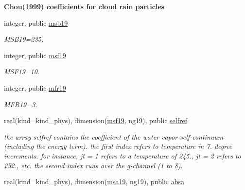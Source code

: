 \begin{Indent}\textbf{ Chou(1999) coefficients for cloud rain particles}\par
\begin{DoxyCompactItemize}
\item 
integer, public \hyperlink{group__module__radsw__kgbnn_ga42771fcf9dd17b5c9d0d03cb2bf1c923}{msb19}
\begin{DoxyCompactList}\small\item\em M\+S\+B19=235. \end{DoxyCompactList}\item 
integer, public \hyperlink{group__module__radsw__kgbnn_ga86778b12ff439f4f83fda891e7ae2bfe}{msf19}
\begin{DoxyCompactList}\small\item\em M\+S\+F19=10. \end{DoxyCompactList}\item 
integer, public \hyperlink{group__module__radsw__kgbnn_ga57f837ef4316dc2441bca3fde3998156}{mfr19}
\begin{DoxyCompactList}\small\item\em M\+F\+R19=3. \end{DoxyCompactList}\item 
real(kind=kind\+\_\+phys), dimension(\hyperlink{group__module__radsw__kgbnn_ga86778b12ff439f4f83fda891e7ae2bfe}{msf19}, ng19), public \hyperlink{group__module__radsw__kgbnn_gadb26cae00c05ac5c048a4db5a319a2eb}{selfref}
\begin{DoxyCompactList}\small\item\em the array selfref contains the coefficient of the water vapor self-\/continuum (including the energy term). the first index refers to temperature in 7. degree increments. for instance, jt = 1 refers to a temperature of 245., jt = 2 refers to 252., etc. the second index runs over the g-\/channel (1 to 8). \end{DoxyCompactList}\item 
real(kind=kind\+\_\+phys), dimension(\hyperlink{namespacemodule__radsw__kgb19_a498993cce64baa8f22c8dfdce632cf85}{msa19}, ng19), public \hyperlink{group__module__radsw__kgbnn_gad9a6fc80122a2f06d9f2277d74e00c85}{absa}

\end{DoxyCompactItemize}
\end{Indent}
